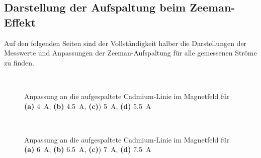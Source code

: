 \documentclass[11pt, a4paper]{article}
\begin{document}
\begin{appendix}
\section{Darstellung der Aufspaltung beim Zeeman-Effekt}
\label{app:penis}

Auf den folgenden Seiten sind der Vollständigkeit halber die Darstellungen der Messwerte und Anpassungen der Zeeman-Aufspaltung für alle gemessenen Ströme zu finden.

\begin{figure}
\begin{subfigure}[c]{0.5\textwidth}
\scalebox{0.75}{
	
	}
	\subcaption{}
\end{subfigure}
\begin{subfigure}[c]{0.5\textwidth}
\scalebox{0.75}{
	
	}
	\subcaption{}
\end{subfigure}
\\
\begin{subfigure}[c]{0.5\textwidth}
	\scalebox{0.75}{
	
	}
	\subcaption{}
\end{subfigure}
\begin{subfigure}[c]{0.5\textwidth}
\scalebox{0.75}{
	
	}
	\subcaption{}
\end{subfigure}
\caption{Anpassung an die aufgespaltete Cadmium-Linie im Magnetfeld für \textbf{(a)} \SI{4}{\ampere}, \textbf{(b)} \SI{4.5}{\ampere}, \textbf{(c)}) \SI{5}{\ampere}, \textbf{(d)} \SI{5.5}{\ampere}}
\end{figure}

\begin{figure}
\begin{subfigure}[c]{0.5\textwidth}
\scalebox{0.75}{
	
	}
	\subcaption{}
\end{subfigure}
\begin{subfigure}[c]{0.5\textwidth}
\scalebox{0.75}{
	
	}
	\subcaption{}
\end{subfigure}
\\
\begin{subfigure}[c]{0.5\textwidth}
	\scalebox{0.75}{
	
	}
	\subcaption{}
\end{subfigure}
\begin{subfigure}[c]{0.5\textwidth}
\scalebox{0.75}{
	
	}
	\subcaption{}
\end{subfigure}
\caption{Anpassung an die aufgespaltete Cadmium-Linie im Magnetfeld für \textbf{(a)} \SI{6}{\ampere}, \textbf{(b)} \SI{6.5}{\ampere}, \textbf{(c)}) \SI{7}{\ampere}, \textbf{(d)} \SI{7.5}{\ampere}}
\end{figure}


\end{appendix}
\end{document}
